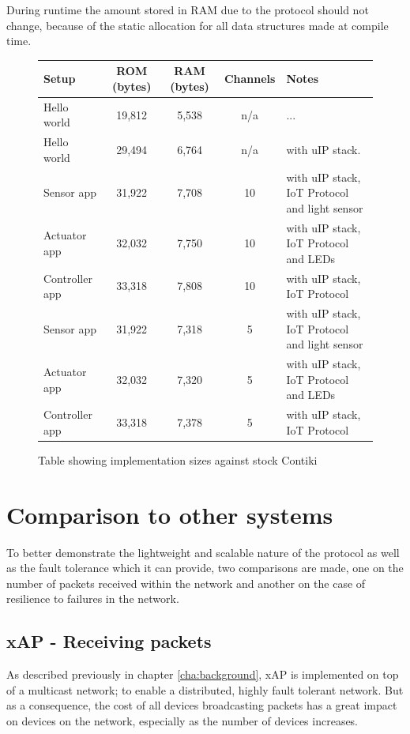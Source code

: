 During runtime the amount stored in RAM due to the protocol should not change, because of the static allocation for all data structures made at compile time.
\begin{figure}[h]
\begin{center}
    \begin{tabular}{| l | c | c | c | l |}
    \hline
    Setup & ROM (bytes) & RAM (bytes) & Channels & Notes \\ \hline
    Hello world & 19,812 & 5,538 & n/a &... \\ \hline
    Hello world & 29,494 & 6,764 & n/a & with uIP stack. \\ \hline
    Sensor app & 31,922 & 7,708 & 10 & with uIP stack, IoT Protocol and light sensor\\ \hline
    Actuator app & 32,032 & 7,750 & 10 & with uIP stack, IoT Protocol and LEDs \\ \hline
    Controller app & 33,318 & 7,808 & 10 & with uIP stack, IoT Protocol \\ \hline
    Sensor app & 31,922 & 7,318 & 5 & with uIP stack, IoT Protocol and light sensor\\ \hline
    Actuator app & 32,032 & 7,320 & 5 & with uIP stack, IoT Protocol and LEDs \\ \hline
    Controller app & 33,318 & 7,378 & 5 & with uIP stack, IoT Protocol \\ 
    \hline
    \end{tabular}
\end{center}
\caption{Table showing implementation sizes against stock Contiki}
\label{tab:size}
\end{figure}

\section{Comparison to other systems} %
\label{sec:comparison_to_other_systems}
To better demonstrate the lightweight and scalable nature of the protocol as well as the fault tolerance which it can provide, two comparisons are made, one on the number of packets received within the network and another on the case of resilience to failures in the network.

\subsection{xAP - Receiving packets} %
\label{sub:xap}
As described previously in chapter \ref{cha:background}, xAP is implemented on top of a multicast network; to enable a distributed, highly fault tolerant network. But as a consequence, the cost of all devices broadcasting packets has a great impact on devices on the network, especially as the number of devices increases. 

